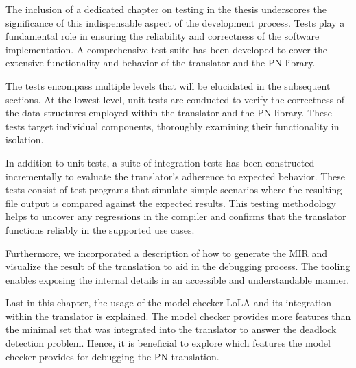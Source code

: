 The inclusion of a dedicated chapter on testing in the thesis underscores
the significance of this indispensable aspect of the development process.
Tests play a fundamental role in ensuring
the reliability and correctness of the software implementation.
A comprehensive test suite has been developed
to cover the extensive functionality and behavior
of the translator and the \acrshort{PN} library.

The tests encompass multiple levels
that will be elucidated in the subsequent sections.
At the lowest level, unit tests are conducted
to verify the correctness of the data structures
employed within the translator and the \acrshort{PN} library.
These tests target individual components,
thoroughly examining their functionality in isolation.

In addition to unit tests,
a suite of integration tests has been constructed incrementally
to evaluate the translator's adherence to expected behavior.
These tests consist of test programs that simulate simple scenarios where
the resulting file output is compared against the expected results.
This testing methodology helps to uncover any regressions in the compiler
and confirms that the translator functions reliably in the supported use cases.

Furthermore, we incorporated a description of how to generate the \acrshort{MIR} and
visualize the result of the translation to aid in the debugging process.
The tooling enables exposing the internal details in an accessible and understandable manner.

Last in this chapter, the usage of the model checker \acrshort{LoLA}
and its integration within the translator is explained.
The model checker provides more features than the minimal set
that was integrated into the translator to answer the deadlock detection problem.
Hence, it is beneficial to explore
which features the model checker provides for debugging the \acrshort{PN} translation.